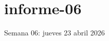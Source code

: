 \documentclass[./informes.tex]{subfiles}
\begin{document}
\chapter{informe-06}

Semana 06: jueves 23 abril 2026







\printbibliography[
  heading=subbibliography
]
\end{document}
